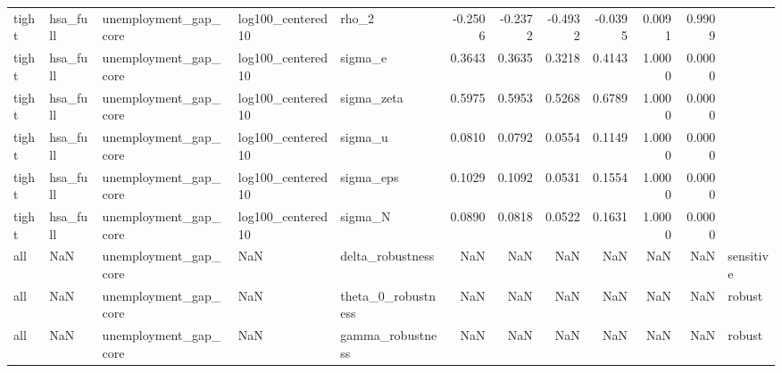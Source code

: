 \begin{tabular}{lllllrrrrrrl}
tight & hsa\_full & unemployment\_gap\_core & log100\_centered10 & rho\_2 & -0.2506 & -0.2372 & -0.4932 & -0.0395 & 0.0091 & 0.9909 &  \\
tight & hsa\_full & unemployment\_gap\_core & log100\_centered10 & sigma\_e & 0.3643 & 0.3635 & 0.3218 & 0.4143 & 1.0000 & 0.0000 &  \\
tight & hsa\_full & unemployment\_gap\_core & log100\_centered10 & sigma\_zeta & 0.5975 & 0.5953 & 0.5268 & 0.6789 & 1.0000 & 0.0000 &  \\
tight & hsa\_full & unemployment\_gap\_core & log100\_centered10 & sigma\_u & 0.0810 & 0.0792 & 0.0554 & 0.1149 & 1.0000 & 0.0000 &  \\
tight & hsa\_full & unemployment\_gap\_core & log100\_centered10 & sigma\_eps & 0.1029 & 0.1092 & 0.0531 & 0.1554 & 1.0000 & 0.0000 &  \\
tight & hsa\_full & unemployment\_gap\_core & log100\_centered10 & sigma\_N & 0.0890 & 0.0818 & 0.0522 & 0.1631 & 1.0000 & 0.0000 &  \\
all & NaN & unemployment\_gap\_core & NaN & delta\_robustness & NaN & NaN & NaN & NaN & NaN & NaN & sensitive \\
all & NaN & unemployment\_gap\_core & NaN & theta\_0\_robustness & NaN & NaN & NaN & NaN & NaN & NaN & robust \\
all & NaN & unemployment\_gap\_core & NaN & gamma\_robustness & NaN & NaN & NaN & NaN & NaN & NaN & robust \\
\bottomrule
\end{tabular}
